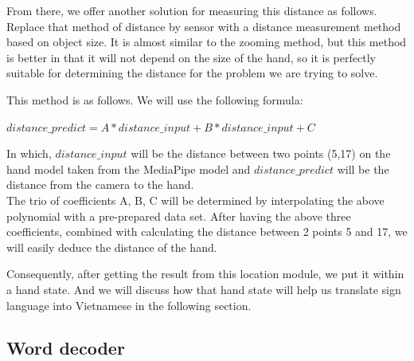 From there, we offer another solution for measuring this distance as follows. Replace that method of distance by sensor with a distance measurement method based on object size. It is almost similar to the zooming method, but this method is better in that it will not depend on the size of the hand, so it is perfectly suitable for determining the distance for the problem we are trying to solve.

This method is as follows. We will use the following formula:
\begin{center}
  $ distance\_predict = A*distance\_input + B*distance\_input + C $ 
\end{center}

In which, $distance\_input$ will be the distance between two points (5,17) on the hand model taken from the MediaPipe model and $distance\_predict$ will be the distance from the camera to the hand. \\

The trio of coefficients A, B, C will be determined by interpolating the above polynomial with a pre-prepared data set. After having the above three coefficients, combined with calculating the distance between 2 points 5 and 17, we will easily deduce the distance of the hand.



Consequently, after getting the result from this location module, we put it within a hand state. And we will discuss how that hand state will help us translate sign language into Vietnamese in the following section.

  
  

  





\subsection{Word decoder}

